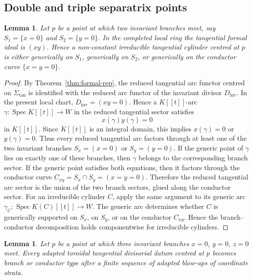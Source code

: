 \documentclass[11pt]{amsart}
\numberwithin{equation}{section}
\theoremstyle{plain}
\newtheorem{Lemma}[Theorem]{Lemma}
\theoremstyle{definition}
\newcommand{\Spec}{\operatorname{Spec}}
\newcommand{\Dinv}{D_{\mathrm{inv}}}
\begin{document}
\subsection{Double and triple separatrix points}

\begin{Lemma}
Let $p$ be a point at which two invariant branches meet, say $S_1=\{x=0\}$ and $S_2=\{y=0\}$.  In the completed local ring the tangential formal ideal is $(xy)$.  Hence a non-constant irreducible tangential cylinder centred at $p$ is either generically on $S_1$, generically on $S_2$, or generically on the conductor curve $\{x=y=0\}$.
\end{Lemma}

\begin{proof}
By Theorem~\ref{thm:formal-rep}, the reduced tangential arc functor centred on \(\Sigma_{\tan}\) is identified with the reduced arc functor of the invariant divisor \(\Dinv\). In the present local chart, \(\Dinv=(xy=0)\). Hence a \(K[[t]]\)-arc \(\gamma:\Spec K[[t]]\to W\) in the reduced tangential sector satisfies
\[
x(\gamma)y(\gamma)=0
\]
in \(K[[t]]\). Since \(K[[t]]\) is an integral domain, this implies
$
x(\gamma)=0
 $ or $
y(\gamma)=0.$
Thus every reduced tangential arc factors through at least one of the two invariant branches \(S_x=(x=0)\) or \(S_y=(y=0)\).
If the generic point of \(\gamma\) lies on exactly one of these branches, then \(\gamma\) belongs to the corresponding branch sector. If the generic point satisfies both equations, then it factors through the conductor curve
$
C_{xy}=S_x\cap S_y=(x=y=0).
$
Therefore the reduced tangential arc sector is the union of the two branch sectors, glued along the conductor sector.
For an irreducible cylinder \(C\), apply the same argument to its generic arc \(\gamma_C:\Spec K(C)[[t]]\to W\). The generic arc determines whether \(C\) is generically supported on \(S_x\), on \(S_y\), or on the conductor \(C_{xy}\). Hence the branch--conductor decomposition holds componentwise for irreducible cylinders.
\end{proof}

\begin{Lemma}
Let $p$ be a point at which three invariant branches $x=0$, $y=0$, $z=0$ meet.  Every adapted toroidal tangential divisorial datum centred at $p$ becomes branch or conductor type after a finite sequence of adapted blow-ups of coordinate strata.
\end{Lemma}
\end{document}
